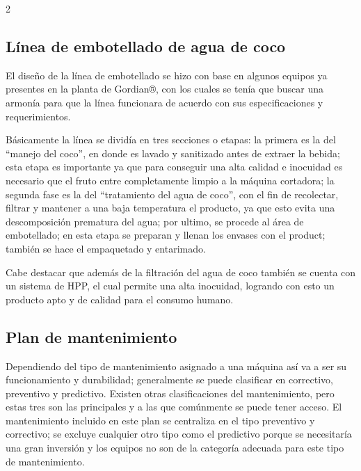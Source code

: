 \documentclass[11pt,spanish,Letterpaper,openany]{book}
\begin{document}
\begin {multicols}{2}

\hypertarget{linea-de-embotellado-de-agua-de-coco}{%
\subsection{Línea de embotellado de agua de coco}\label{linea-de-embotellado-de-agua-de-coco}}

El diseño de la línea de embotellado se hizo con base en algunos equipos ya presentes en la planta de Gordian®, con los cuales se tenía que buscar una armonía para que la línea funcionara de acuerdo con sus especificaciones y requerimientos.

Básicamente la línea se dividía en tres secciones o etapas: la primera es la del ``manejo del coco'', en donde es lavado y sanitizado antes de extraer la bebida; esta etapa es importante ya que para conseguir una alta calidad e inocuidad es necesario que el fruto entre completamente limpio a la máquina cortadora; la segunda fase es la del ``tratamiento del agua de coco'', con el fin de recolectar, filtrar y mantener a una baja temperatura el producto, ya que esto evita una descomposición prematura del agua; por ultimo, se procede al área de embotellado; en esta etapa se preparan y llenan los envases con el product; también se hace el empaquetado y entarimado.

Cabe destacar que además de la filtración del agua de coco también se cuenta con un sistema de HPP, el cual permite una alta inocuidad, logrando con esto un producto apto y de calidad para el consumo humano.

\hypertarget{plan-de-mantenimiento}{%
\subsection{Plan de mantenimiento}\label{plan-de-mantenimiento}}

Dependiendo del tipo de mantenimiento asignado a una máquina así va a ser su funcionamiento y durabilidad; generalmente se puede clasificar en correctivo, preventivo y predictivo. Existen otras clasificaciones del mantenimiento, pero estas tres son las principales y a las que comúnmente se puede tener acceso. El mantenimiento incluido en este plan se centraliza en el tipo preventivo y correctivo; se excluye cualquier otro tipo como el predictivo porque se necesitaría una gran inversión y los equipos no son de la categoría adecuada para este tipo de mantenimiento.


\end{multicols}
\end{document}
